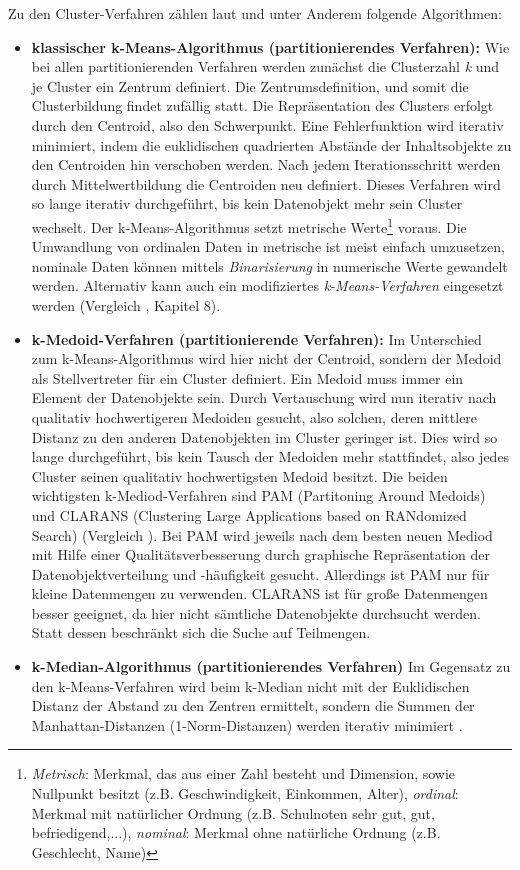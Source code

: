 Zu den Cluster-Verfahren zählen laut  und  unter Anderem folgende Algorithmen:

\begin{itemize}
		\item \textbf{klassischer k-Means-Algorithmus (partitionierendes Verfahren):} Wie bei allen partitionierenden Verfahren werden zunächst die Clusterzahl \textit{k} und je Cluster ein Zentrum definiert. Die Zentrumsdefinition, und somit die Clusterbildung findet zufällig statt. Die Repräsentation des Clusters erfolgt durch den Centroid, also den Schwerpunkt. Eine Fehlerfunktion wird iterativ minimiert, indem die euklidischen quadrierten Abstände der Inhaltsobjekte zu den Centroiden hin verschoben werden. Nach jedem Iterationsschritt werden durch Mittelwertbildung die Centroiden neu definiert. Dieses Verfahren wird so lange iterativ durchgeführt, bis kein Datenobjekt mehr sein Cluster wechselt. Der k-Means-Algorithmus setzt metrische Werte\footnote{\textit{Metrisch}: Merkmal, das aus einer Zahl besteht und Dimension, sowie Nullpunkt besitzt (z.B. Geschwindigkeit, Einkommen, Alter), \textit{ordinal}: Merkmal mit natürlicher Ordnung (z.B. Schulnoten sehr gut, gut, befriedigend,...), \textit{nominal}: Merkmal ohne natürliche Ordnung (z.B. Geschlecht, Name)} voraus. Die Umwandlung von ordinalen Daten in metrische ist meist einfach umzusetzen, nominale Daten können mittels \textit{Binarisierung} in numerische Werte gewandelt werden. Alternativ kann auch ein modifiziertes \textit{k-Means-Verfahren} eingesetzt werden (Vergleich , Kapitel 8).
		\item \textbf{k-Medoid-Verfahren (partitionierende Verfahren):} Im Unterschied zum k-Means-Algorithmus wird hier nicht der Centroid, sondern der Medoid als Stellvertreter für ein Cluster definiert. Ein Medoid muss immer ein Element der Datenobjekte sein. Durch Vertauschung wird nun iterativ nach qualitativ hochwertigeren Medoiden gesucht, also solchen, deren mittlere Distanz zu den anderen Datenobjekten im Cluster geringer ist. Dies wird so lange durchgeführt, bis kein Tausch der Medoiden mehr stattfindet, also jedes Cluster seinen qualitativ hochwertigsten Medoid besitzt. Die beiden wichtigsten k-Mediod-Verfahren sind PAM (Partitoning Around Medoids) und CLARANS (Clustering Large Applications based on RANdomized Search) (Vergleich ). Bei PAM wird jeweils nach dem besten neuen Mediod mit Hilfe einer Qualitätsverbesserung durch graphische Repräsentation der Datenobjektverteilung und -häufigkeit gesucht. Allerdings ist PAM nur für kleine Datenmengen zu verwenden. CLARANS ist für große Datenmengen besser geeignet, da hier nicht sämtliche Datenobjekte durchsucht werden. Statt dessen beschränkt sich die Suche auf Teilmengen.   
		\item \textbf{k-Median-Algorithmus (partitionierendes Verfahren)} Im Gegensatz zu den k-Means-Verfahren wird beim k-Median nicht mit der Euklidischen Distanz der Abstand zu den Zentren ermittelt, sondern die Summen der Manhattan-Distanzen (1-Norm-Distanzen) werden iterativ minimiert .


\end{itemize}
